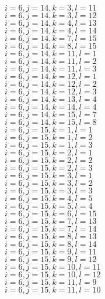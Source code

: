 \documentclass[14pt]{article}
\begin{document}
    $i=6,j=14,k=3,l=11 $ \\ 
    $i=6,j=14,k=3,l=12 $ \\ 
    $i=6,j=14,k=4,l=13 $ \\ 
    $i=6,j=14,k=4,l=14 $ \\ 
    $i=6,j=14,k=7,l=15 $ \\ 
    $i=6,j=14,k=8,l=15 $ \\ 
    $i=6,j=14,k=11,l=1 $ \\ 
    $i=6,j=14,k=11,l=2 $ \\ 
    $i=6,j=14,k=11,l=3 $ \\ 
    $i=6,j=14,k=12,l=1 $ \\ 
    $i=6,j=14,k=12,l=2 $ \\ 
    $i=6,j=14,k=12,l=3 $ \\ 
    $i=6,j=14,k=13,l=4 $ \\ 
    $i=6,j=14,k=14,l=4 $ \\ 
    $i=6,j=14,k=15,l=7 $ \\ 
    $i=6,j=14,k=15,l=8 $ \\ 
    $i=6,j=15,k=1,l=1 $ \\ 
    $i=6,j=15,k=1,l=2 $ \\ 
    $i=6,j=15,k=1,l=3 $ \\ 
    $i=6,j=15,k=2,l=1 $ \\ 
    $i=6,j=15,k=2,l=2 $ \\ 
    $i=6,j=15,k=2,l=3 $ \\ 
    $i=6,j=15,k=3,l=1 $ \\ 
    $i=6,j=15,k=3,l=2 $ \\ 
    $i=6,j=15,k=3,l=3 $ \\ 
    $i=6,j=15,k=4,l=5 $ \\ 
    $i=6,j=15,k=5,l=4 $ \\ 
    $i=6,j=15,k=6,l=15 $ \\ 
    $i=6,j=15,k=7,l=13 $ \\ 
    $i=6,j=15,k=7,l=14 $ \\ 
    $i=6,j=15,k=8,l=13 $ \\ 
    $i=6,j=15,k=8,l=14 $ \\ 
    $i=6,j=15,k=9,l=11 $ \\ 
    $i=6,j=15,k=9,l=12 $ \\ 
    $i=6,j=15,k=10,l=11 $ \\ 
    $i=6,j=15,k=10,l=12 $ \\ 
    $i=6,j=15,k=11,l=9 $ \\ 
    $i=6,j=15,k=11,l=10 $ \\ 
\end{document}
